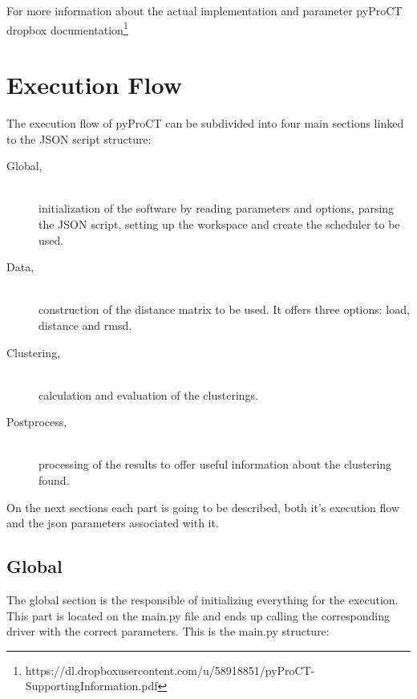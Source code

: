 For more information about the actual implementation and parameter pyProCT dropbox documentation\footnote{ https://dl.dropboxusercontent.com/u/58918851/pyProCT-SupportingInformation.pdf} 

\section{Execution Flow}
\label{sec:execution_flow}

The execution flow of pyProCT can be subdivided into four main sections linked to the JSON script structure:

\begin{description}
\item [Global,] \hfill \\ initialization of the software by reading parameters and options, parsing the JSON script, setting up the workspace and create the scheduler to be used.
\item [Data,] \hfill \\ construction of the distance matrix to be used. It offers three options: load, distance and rmsd.
\item [Clustering,] \hfill \\ calculation and evaluation of the clusterings.
\item [Postprocess,] \hfill \\ processing of the results to offer useful information about the clustering found.
\end{description}

On the next sections each part is going to be described, both it's execution flow and the json parameters associated with it.

\subsection{Global}

The global section is the responsible of initializing everything for the execution. This part is located on the main.py file and ends up calling the corresponding driver with the correct parameters. This is the main.py structure:

